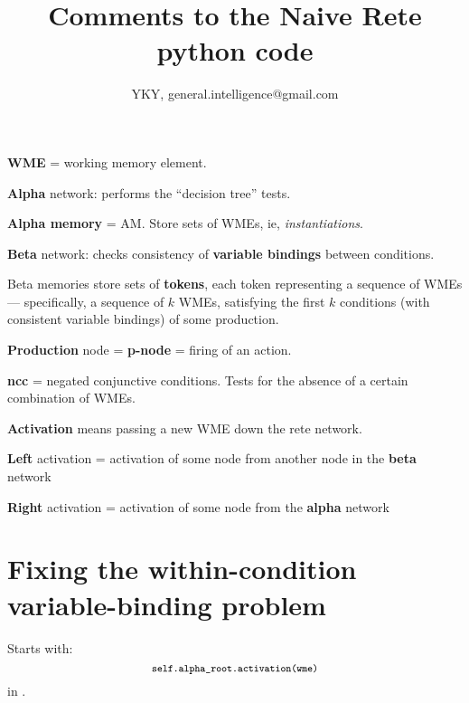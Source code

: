 

\usepackage[CJKspace]{xeCJK}
\usepackage{color}

\usepackage{mathtools}
\usepackage{hyperref}

\title{Comments to the Naive Rete python code}
\author{YKY, general.intelligence@gmail.com}


\maketitle

\textbf{WME} = working memory element.

\textbf{Alpha} network: performs the ``decision tree'' tests.

\textbf{Alpha memory} = AM.  Store sets of WMEs, ie, \textit{instantiations}.

\textbf{Beta} network: checks consistency of \textbf{variable bindings} between conditions.

Beta memories store sets of \textbf{tokens}, each token representing a sequence of WMEs --- specifically, a sequence of $k$ WMEs, satisfying the first $k$ conditions (with consistent variable bindings) of some production.

\textbf{Production} node = \textbf{p-node} = firing of an action.

\textbf{ncc} = negated conjunctive conditions.  Tests for the absence of a certain combination of WMEs.

\textbf{Activation} means passing a new WME down the rete network.

\textbf{Left} activation = activation of some node from another node in the \textbf{beta} network

\textbf{Right} activation = activation of some node from the \textbf{alpha} network

\section{Fixing the within-condition variable-binding problem}

Starts with:
\begin{equation}
{\footnotesize
\verb! self.alpha_root.activation(wme) !
}
\end{equation}
in .


